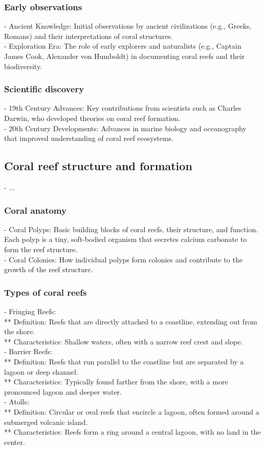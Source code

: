 \subsubsection{Early observations}
- Ancient Knowledge: Initial observations by ancient civilizations (e.g., Greeks, Romans) and their interpretations of coral structures. \\
- Exploration Era: The role of early explorers and naturalists (e.g., Captain James Cook, Alexander von Humboldt) in documenting coral reefs and their biodiversity.
\subsubsection{Scientific discovery}
- 19th Century Advances: Key contributions from scientists such as Charles Darwin, who developed theories on coral reef formation. \\
- 20th Century Developments: Advances in marine biology and oceanography that improved understanding of coral reef ecosystems.

\subsection{Coral reef structure and formation}
- ... 
\subsubsection{Coral anatomy}
- Coral Polyps: Basic building blocks of coral reefs, their structure, and function. Each polyp is a tiny, soft-bodied organism that secretes calcium carbonate to form the reef structure. \\
- Coral Colonies: How individual polyps form colonies and contribute to the growth of the reef structure. 
\subsubsection{Types of coral reefs}
- Fringing Reefs: \\
** Definition: Reefs that are directly attached to a coastline, extending out from the shore. \\
** Characteristics: Shallow waters, often with a narrow reef crest and slope. \\
- Barrier Reefs: \\
** Definition: Reefs that run parallel to the coastline but are separated by a lagoon or deep channel. \\
** Characteristics: Typically found farther from the shore, with a more pronounced lagoon and deeper water. \\
- Atolls: \\
** Definition: Circular or oval reefs that encircle a lagoon, often formed around a submerged volcanic island. \\
** Characteristics: Reefs form a ring around a central lagoon, with no land in the center. 

